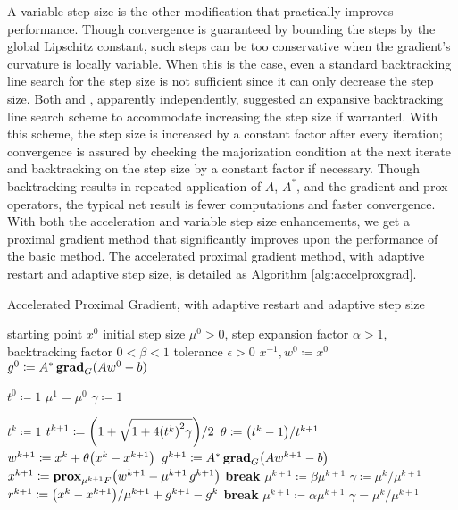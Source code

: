 A variable step size is the other modification that practically improves performance. Though convergence is guaranteed by bounding the steps by the global Lipschitz constant, such steps can be too conservative when the gradient's curvature is locally variable. When this is the case, even a standard backtracking line search for the step size is not sufficient since it can only decrease the step size. Both \textcite{SGB11} and \textcite{BCG11}, apparently independently, suggested an expansive backtracking line search scheme to accommodate increasing the step size if warranted. With this scheme, the step size is increased by a constant factor after every iteration; convergence is assured by checking the majorization condition at the next iterate and backtracking on the step size by a constant factor if necessary. Though backtracking results in repeated application of $A$, $A^*$, and the gradient and prox operators, the typical net result is fewer computations and faster convergence. With both the acceleration and variable step size enhancements, we get a proximal gradient method that significantly improves upon the performance of the basic method. The accelerated proximal gradient method, with adaptive restart and adaptive step size, is detailed as Algorithm \ref{alg:accelproxgrad}.
\begin{algorithm}[tpb]
 \caption{Accelerated Proximal Gradient, with adaptive restart and adaptive step size}
 \label{alg:accelproxgrad}
 \begin{algorithmic}
  \GIVEN starting point $x^0$
  \GIVEN initial step size $\mu^0 > 0$, step expansion factor $\alpha > 1$, backtracking factor $0 < \beta < 1$
  \GIVEN tolerance $\epsilon > 0$
  \STATE $x^{-1}, w^0 \coloneqq x^0$
  \STATE $g^0 \coloneqq A^* \operatorname{\mathbf{grad}}_{G}(Aw^0 - b)$

  \STATE $t^0 \coloneqq 1$
  \STATE $\mu^1 = \mu^0$
  \STATE $\gamma \coloneqq 1$
  
  \REPEAT
    \STATE $t^k \coloneqq 1$
   \ENDIF
   \REPEAT
    \STATE $t^{k+1} \coloneqq \paren*{1 + \sqrt{1 + 4\paren*{t^k}^2 \gamma}}/2$
    \STATE $\theta \coloneqq \paren*{t^k - 1}/t^{k+1}$
    \STATE $w^{k+1} \coloneqq x^k + \theta \paren*{x^k - x^{k+1}}$
    \STATE
    \STATE $g^{k+1} \coloneqq A^* \grad_{G}\paren*{Aw^{k+1} - b}$
    \STATE $x^{k+1} \coloneqq \prox_{\mu^{k+1} F}\paren*{w^{k+1} - \mu^{k+1} \, g^{k+1}}$
    \STATE
     \STATE \textbf{break}
    \ELSE
     \STATE $\mu^{k+1} \coloneqq \beta \mu^{k+1}$
     \STATE $\gamma \coloneqq \mu^{k} / \mu^{k+1}$
    \ENDIF
   \UNTIL
   \STATE $r^{k+1} \coloneqq \paren*{x^k - x^{k+1}}/\mu^{k+1} + g^{k+1} - g^k$
    \STATE \textbf{break}
   \ENDIF
   \STATE $\mu^{k+1} \coloneqq \alpha \mu^{k+1}$
   \STATE $\gamma = \mu^k / \mu^{k+1}$
  \UNTIL
 \end{algorithmic}
\end{algorithm}%

